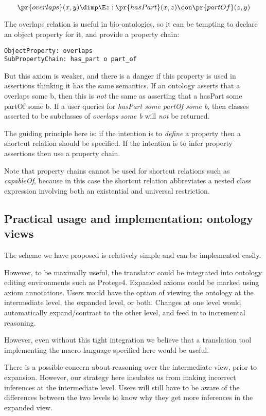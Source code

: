 \documentclass{llncs}
\begin{document}
$$
\pr{overlaps}(x,y) \dimp \E z: \pr{hasPart}(x,z) \con \pr{partOf}(z,y)
$$

The overlaps relation is useful in bio-ontologies\cite{dahdul2009}, so
it can be tempting to declare an object property for it, and provide a
property chain:

\begin{verbatim}
ObjectProperty: overlaps
SubPropertyChain: has_part o part_of
\end{verbatim}

But this axiom is weaker, and there is a danger if this property is
used in assertions thinking it has the same semantics. If an ontology
asserts that a overlaps some b, then this is \emph{not} the same as
asserting that a hasPart some partOf some b. If a user queries for
\emph{hasPart some partOf some b}, then classes asserted to be
subclasses of \emph{overlaps some b} will \emph{not} be returned.

The guiding principle here is: if the intention is to \emph{define} a
property then a shortcut relation should be specified. If the
intention is to infer property assertions then use a property chain.

Note that property chains cannot be used for shortcut relations such
as \emph{capableOf}, because in this case the shortcut relation
abbreviates a nested class expression involving both an existential
and universal restriction.

\subsection{Practical usage and implementation: ontology views}

The scheme we have proposed is relatively simple and can be
implemented easily.

However, to be maximally useful, the translator could be integrated
into ontology editing environments such as
Protege4\cite{horridge2006supporting}. Expanded axioms could be marked
using axiom annotations. Users would have the option of viewing the
ontology at the intermediate level, the expanded level, or
both. Changes at one level would automatically expand/contract to the
other level, and feed in to incremental reasoning.

However, even without this tight integration we believe that a
translation tool implementing the macro language specified here would
be useful.

There is a possible concern about reasoning over the intermediate
view, prior to expansion. However, our strategy here insulates us from
making incorrect inferences at the intermediate level. Users will
still have to be aware of the differences between the two levels to
know why they get more inferences in the expanded view.
\end{document}
